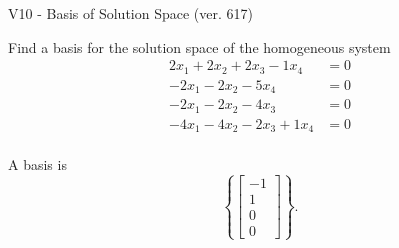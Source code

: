 \begin{exercise}
  \begin{exerciseTitle}V10 - Basis of Solution Space (ver. 617)\end{exerciseTitle}
  \begin{exerciseStatement}
    Find a basis for the solution space of the homogeneous system 
\begin{align*}
 2 x_ 1 + 2 x_ 2 + 2 x_ 3 -1 x_ 4 &= 0  \\ 
  -2 x_ 1 -2 x_ 2 -5 x_ 4 &= 0  \\ 
  -2 x_ 1 -2 x_ 2 -4 x_ 3 &= 0  \\ 
  -4 x_ 1 -4 x_ 2 -2 x_ 3 + 1 x_ 4 &= 0  \\ 
 \end{align*}


 
  \end{exerciseStatement}

  \begin{exerciseAnswer}
   A basis is   
\[\left\{\left[\begin{array}{c}
-1 \\
1 \\
0 \\
0
\end{array}\right]\right\}.\]

  


  \end{exerciseAnswer}
\end{exercise}